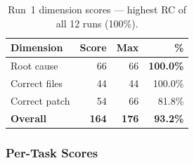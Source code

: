 \begin{table}[h]
\centering
\caption{Run~1 dimension scores --- highest RC of all 12 runs (100\%).}\label{tab:r1-dim}
\begin{tabular}{lrrr}
\toprule
\textbf{Dimension} & \textbf{Score} & \textbf{Max} & \textbf{\%} \\
\midrule
Root cause         & 66 & 66 & \textbf{100.0\%} \\
Correct files      & 44 & 44 & 100.0\% \\
Correct patch      & 54 & 66 & 81.8\% \\
\midrule
\textbf{Overall}   & \textbf{164} & \textbf{176} & \textbf{93.2\%} \\
\bottomrule
\end{tabular}
\end{table}

\subsubsection{Per-Task Scores}


